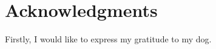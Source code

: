 
\section*{Acknowledgments}

Firstly, I would like to express my gratitude to my dog.

\vspace{2.5cm}
